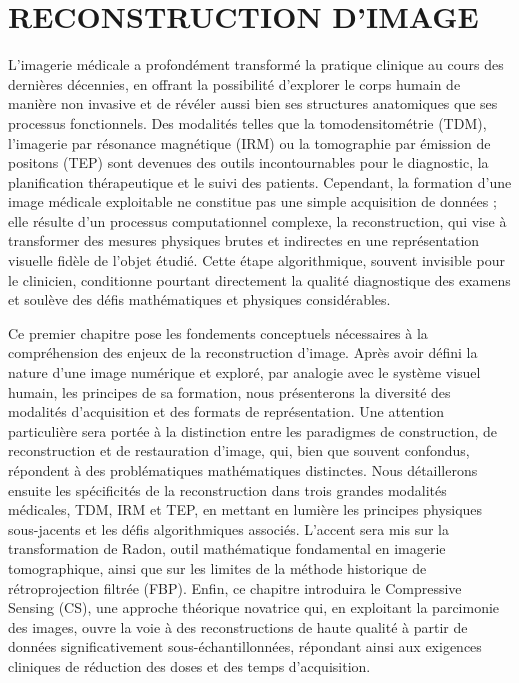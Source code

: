 
\chapter{RECONSTRUCTION D'IMAGE}
\label{chapitre1} 

L'imagerie médicale a profondément transformé la pratique clinique au cours des dernières décennies, en offrant la possibilité d'explorer le corps humain de manière non invasive et de révéler aussi bien ses structures anatomiques que ses processus fonctionnels. Des modalités telles que la tomodensitométrie (TDM), l'imagerie par résonance magnétique (IRM) ou la tomographie par émission de positons (TEP) sont devenues des outils incontournables pour le diagnostic, la planification thérapeutique et le suivi des patients. Cependant, la formation d'une image médicale exploitable ne constitue pas une simple acquisition de données ; elle résulte d'un processus computationnel complexe, la reconstruction, qui vise à transformer des mesures physiques brutes et indirectes en une représentation visuelle fidèle de l'objet étudié. Cette étape algorithmique, souvent invisible pour le clinicien, conditionne pourtant directement la qualité diagnostique des examens et soulève des défis mathématiques et physiques considérables.

Ce premier chapitre pose les fondements conceptuels nécessaires à la compréhension des enjeux de la reconstruction d'image. Après avoir défini la nature d'une image numérique et exploré, par analogie avec le système visuel humain, les principes de sa formation, nous présenterons la diversité des modalités d'acquisition et des formats de représentation. Une attention particulière sera portée à la distinction entre les paradigmes de construction, de reconstruction et de restauration d'image, qui, bien que souvent confondus, répondent à des problématiques mathématiques distinctes. Nous détaillerons ensuite les spécificités de la reconstruction dans trois grandes modalités médicales, TDM, IRM et TEP, en mettant en lumière les principes physiques sous-jacents et les défis algorithmiques associés. L'accent sera mis sur la transformation de Radon, outil mathématique fondamental en imagerie tomographique, ainsi que sur les limites de la méthode historique de rétroprojection filtrée (FBP). Enfin, ce chapitre introduira le Compressive Sensing (CS), une approche théorique novatrice qui, en exploitant la parcimonie des images, ouvre la voie à des reconstructions de haute qualité à partir de données significativement sous-échantillonnées, répondant ainsi aux exigences cliniques de réduction des doses et des temps d'acquisition.

